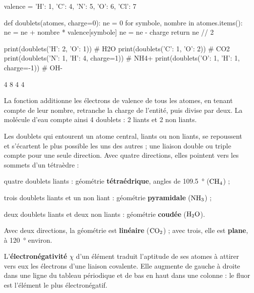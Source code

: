 \begin{python}
valence = {'H': 1, 'C': 4, 'N': 5, 'O': 6, 'Cl': 7}

def doublets(atomes, charge=0):
    ne = 0
    for symbole, nombre in atomes.items():
        ne = ne + nombre * valence[symbole]
    ne = ne - charge
    return ne // 2

print(doublets({'H': 2, 'O': 1}))              # H2O
print(doublets({'C': 1, 'O': 2}))              # CO2
print(doublets({'N': 1, 'H': 4}, charge=1))    # NH4+
print(doublets({'O': 1, 'H': 1}, charge=-1))   # OH-
\end{python}
\begin{console}
4
8
4
4
\end{console}
\noindent{} La fonction  additionne les électrons de valence de tous les atomes, en tenant
compte de leur nombre, retranche la charge de l'entité, puis divise par deux. La molécule d'eau compte ainsi 4 doublets :
2 liants et 2 non liants.
\begin{propriete}
Les doublets qui entourent un atome central, liants ou non liants, se repoussent et s'écartent le plus possible les uns des
autres ; une liaison double ou triple compte pour une seule direction. Avec quatre directions, elles pointent vers les
sommets d'un tétraèdre :
\begin{questions}
\item quatre doublets liants : géométrie \textbf{tétraédrique}, angles de \qty{109,5}{\degree} ($\ce{CH4}$) ;
\item trois doublets liants et un non liant : géométrie \textbf{pyramidale} ($\ce{NH3}$) ;
\item deux doublets liants et deux non liants : géométrie \textbf{coudée} ($\ce{H2O}$).
\end{questions}
Avec deux directions, la géométrie est \textbf{linéaire} ($\ce{CO2}$) ; avec trois, elle est \textbf{plane}, à \qty{120}{\degree} environ.
\end{propriete}
\begin{definition}[Électronégativité]
L'\textbf{électronégativité} $\chi$ d'un élément traduit l'aptitude de ses atomes à attirer vers eux les électrons d'une liaison
covalente. Elle augmente de gauche à droite dans une ligne du tableau périodique et de bas en haut dans une colonne : le
fluor est l'élément le plus électronégatif.
\end{definition}
